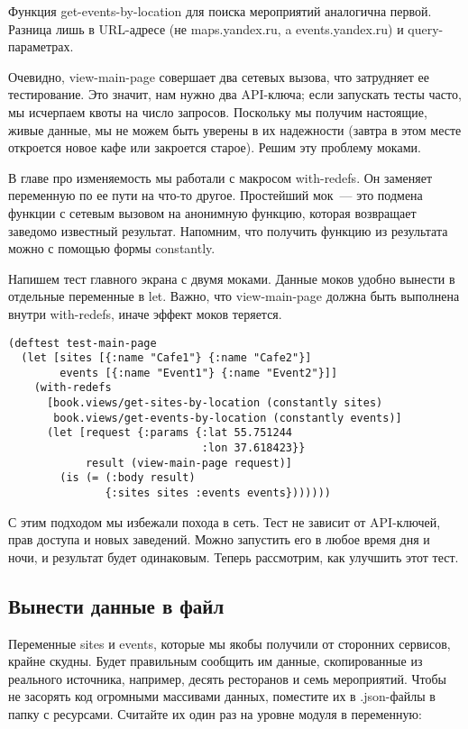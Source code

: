 Функция get-events-by-location для поиска мероприятий аналогична первой. Разница
лишь в URL-адресе (не maps.yandex.ru, a events.yandex.ru) и query-параметрах.

Очевидно, view-main-page совершает два сетевых вызова, что затрудняет ее
тестирование. Это значит, нам нужно два API-ключа; если запускать тесты часто,
мы исчерпаем квоты на число запросов. Поскольку мы получим настоящие, живые
данные, мы не можем быть уверены в их надежности (завтра в этом месте откроется
новое кафе или закроется старое). Решим эту проблему моками.

В главе про изменяемость мы работали с макросом with-redefs. Он заменяет
переменную по ее пути на что-то другое. Простейший мок~--- это подмена функции с
сетевым вызовом на анонимную функцию, которая возвращает заведомо известный
результат. Напомним, что получить функцию из результата можно с помощью формы
constantly.

Напишем тест главного экрана с двумя моками. Данные моков удобно вынести в
отдельные переменные в let. Важно, что view-main-page должна быть выполнена
внутри with-redefs, иначе эффект моков теряется.

\begin{verbatim}
(deftest test-main-page
  (let [sites [{:name "Cafe1"} {:name "Cafe2"}]
        events [{:name "Event1"} {:name "Event2"}]]
    (with-redefs
      [book.views/get-sites-by-location (constantly sites)
       book.views/get-events-by-location (constantly events)]
      (let [request {:params {:lat 55.751244
                              :lon 37.618423}}
            result (view-main-page request)]
        (is (= (:body result)
               {:sites sites :events events}))))))
\end{verbatim}

С этим подходом мы избежали похода в сеть. Тест не зависит от API-ключей, прав
доступа и новых заведений. Можно запустить его в любое время дня и ночи, и
результат будет одинаковым. Теперь рассмотрим, как улучшить этот тест.

\subsection{Вынести данные в файл}

Переменные sites и events, которые мы якобы получили от сторонних сервисов,
крайне скудны. Будет правильным сообщить им данные, скопированные из реального
источника, например, десять ресторанов и семь мероприятий. Чтобы не засорять код
огромными массивами данных, поместите их в .json-файлы в папку с
ресурсами. Считайте их один раз на уровне модуля в переменную:

